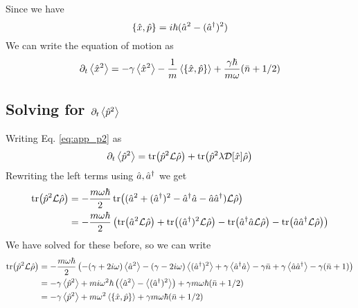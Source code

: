 Since we have
\begin{equation}
    \acomm{\xop}{\pop} = i\hbar ( \a^2 - (\ad)^2 )
\end{equation}
We can write the equation of motion as
\begin{equation}
    \dt\expval{\xop^2} = - \gamma \expval{\xop^2} - \frac{1}{m}\expval{\acomm{\xop}{\pop}} + \frac{\gamma \hbar}{m\omega}(\nbar + 1/2)
\end{equation}

\subsection{Solving for $\partial_t\expval{\hat{p}^2}$}
Writing Eq. \eqref{eq:app_p2} as 
\begin{equation}
    \partial_t\expval{\hat{p}^2} = \tr(\hat{p}^2 \mathcal{L}\hat{\rho}) + \tr(\hat{p}^2 \lambda \mathcal{D}[\hat{x}] \hat{\rho})\label{eq:app_p2b}
\end{equation}
Rewriting the left terms using $\hat{a},\hat{a}^{\dagger}$ we get
\begin{align}
    \tr(\hat{p}^2\mathcal{L}\hat{\rho}) &= -\frac{m\omega \hbar}{2} \tr((\hat{a}^2 + (\hat{a}^{\dagger})^2 - \hat{a}^{\dagger}\hat{a} - \hat{a}\hat{a}^{\dagger})\mathcal{L}\hat{\rho})\\
    &= -\frac{m\omega \hbar}{2} \left( \tr(\hat{a}^2\mathcal{L}\hat{\rho}) + \tr((\hat{a}^{\dagger})^2\mathcal{L}\hat{\rho}) - \tr(\hat{a}^{\dagger}\hat{a}\mathcal{L}\hat{\rho}) - \tr(\hat{a}\hat{a}^{\dagger}\mathcal{L}\hat{\rho}) \right)
\end{align}
We have solved for these before, so we can write 
\begin{align}
    \tr(\pop^2\liouvillian\dmatrix) &= -\frac{m\omega \hbar}{2} \left( -(\gamma + 2i\omega) \expval{\a^2} -(\gamma - 2i\omega) \expval{(\ad)^2} +\gamma \expval{\ad\a} - \gamma\nbar +\gamma \expval{\a\ad} - \gamma(\nbar + 1)  \right)\\
    &= -\gamma \expval{\pop^2} + m i\omega^2 \hbar \left( \expval{\a^2} - \expval{(\ad)^2} \right) + \gamma m \omega\hbar (\nbar + 1/2)\\
    &= -\gamma \expval{\pop^2} + m\omega^2 \expval{\acomm{\xop}{\pop}} + \gamma m \omega\hbar (\nbar + 1/2)
\end{align}

